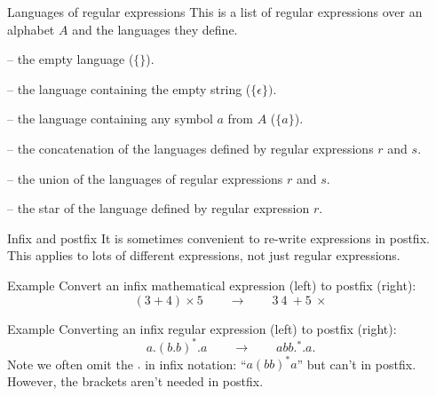 \begin{frame}{Languages of regular expressions}
  This is a list of regular expressions over an alphabet $A$ and the languages they define.
  \begin{description}[aa]
    \setlength\itemsep{4mm}
    \item[$\emptyset$] -- the empty language ($\{\}$).
    \item[$\epsilon$] -- the language containing the empty string ($\{\epsilon\})$.
    \item[$a$] -- the language containing any symbol $a$ from $A$ ($\{a\}$).
    \item[$r.s$] -- the concatenation of the languages defined by regular expressions $r$ and $s$.
    \item[$r|s$] -- the union of the languages of regular expressions $r$ and $s$.
    \item[$r^*$] -- the star of the language defined by regular expression $r$.
  \end{description}
\end{frame}


\begin{frame}{Infix and postfix}
  It is sometimes convenient to re-write expressions in postfix.
  This applies to lots of different expressions, not just regular expressions.
  \begin{exampleblock}{Example}
    Convert an infix mathematical expression (left) to postfix (right):
    $$(3+4) \times 5 \qquad \rightarrow \qquad 3 \ 4 \  + 5 \  \times$$
  \end{exampleblock}
  \begin{exampleblock}{Example}
    Converting an infix regular expression (left) to postfix (right):
    $$a.(b.b)^*.a \qquad  \rightarrow  \qquad  abb.^*.a.$$
    Note we often omit the $.$ in infix notation: ``$a(bb)^*a$'' but can't in postfix.
    However, the brackets aren't needed in postfix.
  \end{exampleblock}
\end{frame}